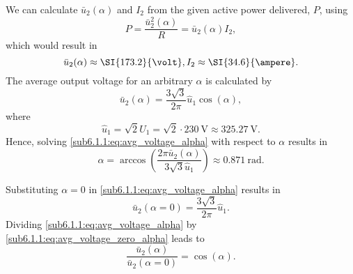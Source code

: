     \begin{solutionblock}
        We can calculate $\bar{u}_\mathrm{2}(\alpha)$ and $I_\mathrm{2}$ from the given active power delivered, $P$, using
        \begin{equation} 
            P = \frac{\bar{u}^2_\mathrm{2}(\alpha)}{R} = \bar{u}_\mathrm{2}(\alpha) I_\mathrm{2},
            \label{sub6.1.1:eq:Active_power_formula}
        \end{equation}
    which would result in 
        \begin{equation}
            \bar{u}_\mathrm{2}(\alpha) \approx \SI{173.2}{\volt},\\
            I_\mathrm{2} \approx \SI{34.6}{\ampere}.
        \end{equation}
        The average output voltage for an arbitrary $\alpha$ is calculated by
        \begin{equation}
            \bar{u}_\mathrm{2}(\alpha) = \frac{3\sqrt{3}}{2\pi}\hat{u}_\mathrm{1}\cos(\alpha),
            \label{sub6.1.1:eq:avg_voltage_alpha}
        \end{equation}
        where
        \begin{equation}
            \hat{u}_\mathrm{1} = \sqrt{2}U_\mathrm{1} = \sqrt{2} \cdot \SI{230}{\volt} \approx \SI{325.27}{\volt}.
            \label{sub6.1.1:eq:voltage_amplitude}
    \end{equation}
    Hence, 
    solving \eqref{sub6.1.1:eq:avg_voltage_alpha} with respect to $\alpha$ results in
        \begin{equation}
            \alpha = \arccos\left(\frac{ 2\pi\bar{u}_\mathrm{2}(\alpha)}{3\sqrt{3}\hat{u}_\mathrm{1}}\right) \approx \SI{0.871}{\radian}.
            \label{sub6.1.1:eq:calculate_alpha}
        \end{equation}    
    
    \end{solutionblock}
    \begin{solutionblock}
        Substituting $\alpha = 0$ in \eqref{sub6.1.1:eq:avg_voltage_alpha} results in
        \begin{equation}
            \bar{u}_\mathrm{2}(\alpha=0) = \frac{3\sqrt{3}}{2\pi}\hat{u}_\mathrm{1}.
            \label{sub6.1.1:eq:avg_voltage_zero_alpha}
        \end{equation}
        Dividing \eqref{sub6.1.1:eq:avg_voltage_alpha} by \eqref{sub6.1.1:eq:avg_voltage_zero_alpha} leads to  
        \begin{equation}
            \frac{ \bar{u}_\mathrm{2}(\alpha)}{\bar{u}_\mathrm{2}(\alpha=0)} = \cos(\alpha).
            \label{sub6.1.1:eq:voltages_relation}
        \end{equation}    
        
    \end{solutionblock}
